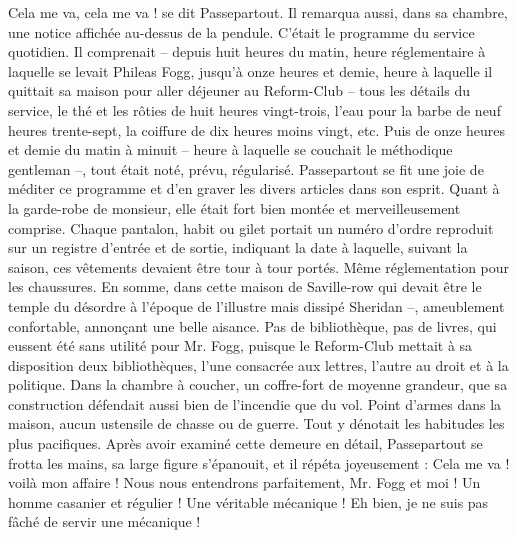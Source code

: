 \documentclass[12pt,a4paper,openany]{book}
\begin{document}
                \og Cela me va, cela me va ! \fg se dit Passepartout.
                Il remarqua aussi, dans sa chambre, une notice affichée au-dessus de la pendule. C’était le programme du service quotidien. Il comprenait – depuis huit heures du matin, heure réglementaire à laquelle se levait Phileas Fogg, jusqu’à onze heures et demie, heure à laquelle il quittait sa maison pour aller déjeuner au Reform-Club – tous les détails du service, le thé et les rôties de huit heures vingt-trois, l’eau pour la barbe de neuf heures trente-sept, la coiffure de dix heures moins vingt, etc. Puis de onze heures et demie du matin à minuit – heure à laquelle se couchait le méthodique gentleman –, tout était noté, prévu, régularisé. Passepartout se fit une joie de méditer ce programme et d’en graver les divers articles dans son esprit.
                Quant à la garde-robe de monsieur, elle était fort bien montée et merveilleusement comprise. Chaque pantalon, habit ou gilet portait un numéro d’ordre reproduit sur un registre d’entrée et de sortie, indiquant la date à laquelle, suivant la saison, ces vêtements devaient être tour à tour portés. Même réglementation pour les chaussures.
                En somme, dans cette maison de Saville-row qui devait être le temple du désordre à l’époque de l’illustre mais dissipé Sheridan –, ameublement confortable, annonçant une belle aisance. Pas de bibliothèque, pas de livres, qui eussent été sans utilité pour Mr. Fogg, puisque le Reform-Club mettait à sa disposition deux bibliothèques, l’une consacrée aux lettres, l’autre au droit et à la politique. Dans la chambre à coucher, un coffre-fort de moyenne grandeur, que sa construction défendait aussi bien de l’incendie que du vol. Point d’armes dans la maison, aucun ustensile de chasse ou de guerre. Tout y dénotait les habitudes les plus pacifiques.
                Après avoir examiné cette demeure en détail, Passepartout se frotta les mains, sa large figure s’épanouit, et il répéta joyeusement :
                \og Cela me va ! voilà mon affaire ! Nous nous entendrons parfaitement, Mr. Fogg et moi ! Un homme casanier et régulier ! Une véritable mécanique ! Eh bien, je ne suis pas fâché de servir une mécanique ! \fg
                
        
        
        \printindex[persName]
        \printindex[placeName]
        
        \tableofcontents
        
        
\end{document}
